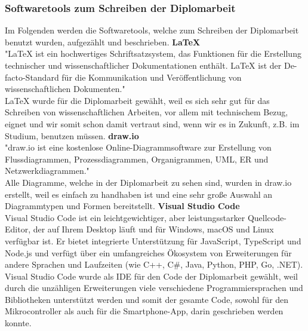 \documentclass[11pt, twoside]{article}
\begin{document}
\subsubsection{Softwaretools zum Schreiben der Diplomarbeit}
Im Folgenden werden die Softwaretools, welche zum Schreiben der Diplomarbeit benutzt wurden, aufgezählt und beschrieben.
\vspace{4mm}\newline
\textbf{\LaTeX} \\
"LaTeX ist ein hochwertiges Schriftsatzsystem, das Funktionen für die Erstellung technischer und wissenschaftlicher Dokumentationen enthält. LaTeX ist der De-facto-Standard für die Kommunikation und Veröffentlichung von wissenschaftlichen Dokumenten." \parencite{noauthor_urlpi29_nodate} \\
LaTeX wurde für die Diplomarbeit gewählt, weil es sich sehr gut für das Schreiben von wissenschaftlichen Arbeiten, vor allem mit technischem Bezug, eignet und wir somit schon damit vertraut sind, wenn wir es in Zukunft, z.B. im Studium, benutzen müssen.
\vspace{4mm}\newline
\textbf{draw.io} \\
"draw.io ist eine kostenlose Online-Diagrammsoftware zur Erstellung von Flussdiagrammen, Prozessdiagrammen, Organigrammen, UML, ER und Netzwerkdiagrammen." \parencite{noauthor_urlpi30_nodate} \\
Alle Diagramme, welche in der Diplomarbeit zu sehen sind, wurden in draw.io erstellt, weil es einfach zu handhaben ist und eine sehr große Auswahl an Diagrammtypen und Formen bereitstellt.
\vspace{4mm}\newline
\textbf{Visual Studio Code} \\
\glqq Visual Studio Code ist ein leichtgewichtiger, aber leistungsstarker Quellcode-Editor, der auf Ihrem Desktop läuft und für Windows, macOS und Linux verfügbar ist. Er bietet integrierte Unterstützung für JavaScript, TypeScript und Node.js und verfügt über ein umfangreiches Ökosystem von Erweiterungen für andere Sprachen und Laufzeiten (wie C++, C\#, Java, Python, PHP, Go, .NET).\grqq{} \parencite{noauthor_urlpi31_nodate} \\
Visual Studio Code wurde als IDE für den Code der Diplomarbeit gewählt, weil durch die unzähligen Erweiterungen viele verschiedene Programmiersprachen und Bibliotheken unterstützt werden und somit der gesamte Code, sowohl für den Mikrocontroller als auch für die Smartphone-App, darin geschrieben werden konnte.
\end{document}

